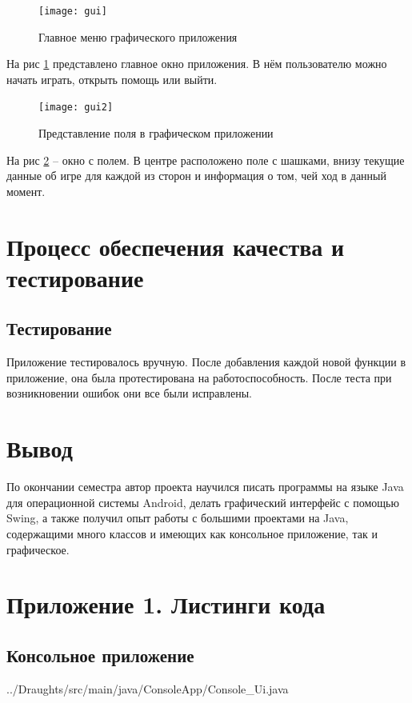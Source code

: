 \documentclass[a4paper]{article}
\begin{document}
\begin{figure}[H]
	\begin{center}
		\texttt{[image: gui]}
		\caption{Главное меню графического приложения} 
		\label{pic:menu} %
	\end{center}
\end{figure}

На рис \ref{pic:menu} представлено главное окно приложения. В нём пользователю можно начать играть, открыть помощь или выйти. 

\begin{figure}[H]
	\begin{center}
		\texttt{[image: gui2]}
		\caption{Представление поля в графическом приложении} 
		\label{pic:field} %
	\end{center}
\end{figure}

На рис \ref{pic:field} – окно с полем. В центре расположено поле с шашками, внизу текущие данные об игре для каждой из сторон и информация о том, чей ход в данный момент.

\section{Процесс обеспечения качества и тестирование}
\subsection{Тестирование}
Приложение тестировалось вручную. После добавления каждой новой функции в приложение, она была протестирована на работоспособность. После теста при возникновении ошибок они все были исправлены.

\section{Вывод}
По окончании семестра автор проекта научился писать программы на языке Java для операционной системы Android, делать графический интерфейс с помощью Swing, а также получил опыт работы с большими проектами на Java, содержащими много классов и имеющих как консольное приложение, так и графическое.

\section{Приложение 1. Листинги кода}
\subsection{Консольное приложение}

{../Draughts/src/main/java/ConsoleApp/Console_Ui.java}
\newpage
\end{document}
